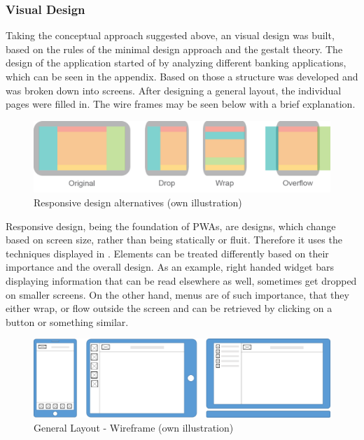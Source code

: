 \subsubsection{Visual Design}
Taking the conceptual approach suggested above, an visual design was built, based on the rules of the minimal design approach and the gestalt theory. The design of the application started of by analyzing different banking applications, which can be seen in the appendix. Based on those a structure was developed and was broken down into screens. After designing a general layout, the individual pages were filled in. The wire frames may be seen below with a brief explanation. 
\begin{figure}[H]
    \centering
    \includegraphics[width=\textwidth]{img/responsive.png}
    \caption[Responsive design alternatives]{Responsive design alternatives (own illustration)}
    \label{fig:response}
\end{figure}
Responsive design, being the foundation of PWAs, are designs, which change based on screen size, rather than being statically or fluit. Therefore it uses the techniques displayed in . Elements can be treated differently based on their importance and the overall design. As an example, right handed widget bars displaying information that can be read elsewhere as well, sometimes get dropped on smaller screens. On the other hand, menus are of such importance, that they either wrap, or flow outside the screen and can be retrieved by clicking on a button or something similar.
\begin{figure}[H]
    \centering
    \includegraphics[width=\textwidth]{img/diagrams/wireframes/general.png}
    \caption[General Layout - Wireframe]{General Layout - Wireframe (own illustration)}
    \label{fig:}
\end{figure}

